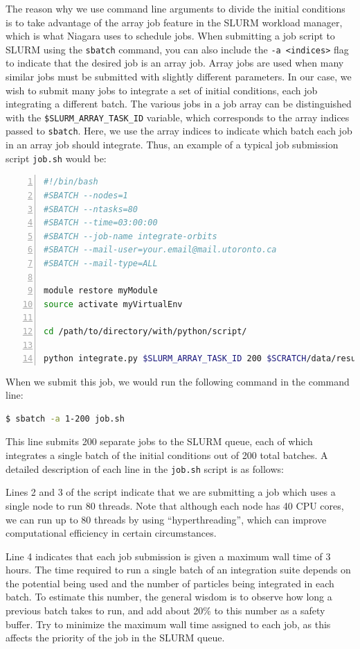 \documentclass[10pt]{article}
\begin{document}
The reason why we use command line arguments to divide the initial conditions is to take advantage of the array job feature in the SLURM workload manager, which is what Niagara uses to schedule jobs. When submitting a job script to SLURM using the \texttt{sbatch} command, you can also include the \texttt{-a <indices>} flag to indicate that the desired job is an array job. Array jobs are used when many similar jobs must be submitted with slightly different parameters. In our case, we wish to submit many jobs to integrate a set of initial conditions, each job integrating a different batch. The various jobs in a job array can be distinguished with the \texttt{\$SLURM\_ARRAY\_TASK\_ID} variable, which corresponds to the array indices passed to \texttt{sbatch}. Here, we use the array indices to indicate which batch each job in an array job should integrate. Thus, an example of a typical job submission script \texttt{job.sh} would be:
\begin{lstlisting}[language=bash, numbers=left]
#!/bin/bash
#SBATCH --nodes=1
#SBATCH --ntasks=80
#SBATCH --time=03:00:00
#SBATCH --job-name integrate-orbits
#SBATCH --mail-user=your.email@mail.utoronto.ca
#SBATCH --mail-type=ALL

module restore myModule
source activate myVirtualEnv

cd /path/to/directory/with/python/script/

python integrate.py $SLURM_ARRAY_TASK_ID 200 $SCRATCH/data/results
\end{lstlisting}
When we submit this job, we would run the following command in the command line:
\begin{lstlisting}[language=bash]
$ sbatch -a 1-200 job.sh
\end{lstlisting}
This line submits 200 separate jobs to the SLURM queue, each of which integrates a single batch of the initial conditions out of 200 total batches. A detailed description of each line in the \texttt{job.sh} script is as follows:

Lines 2 and 3 of the script indicate that we are submitting a job which uses a single node to run 80 threads. Note that although each node has 40 CPU cores, we can run up to 80 threads by using ``hyperthreading'', which can improve computational efficiency in certain circumstances. 

Line 4 indicates that each job submission is given a maximum wall time of 3 hours. The time required to run a single batch of an integration suite depends on the potential being used and the number of particles being integrated in each batch. To estimate this number, the general wisdom is to observe how long a previous batch takes to run, and add about 20\% to this number as a safety buffer. Try to minimize the maximum wall time assigned to each job, as this affects the priority of the job in the SLURM queue.
\end{document}

